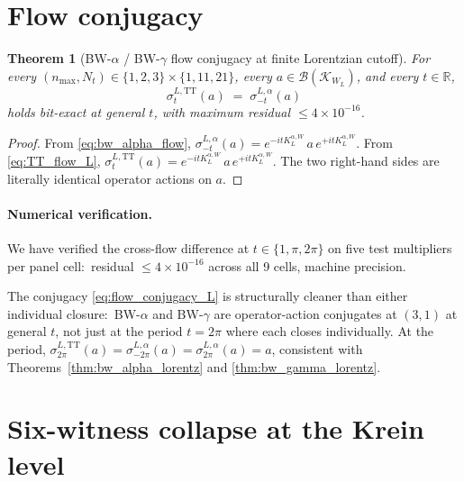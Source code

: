 \documentclass[11pt,a4paper]{article}
\theoremstyle{plain}
\newtheorem{theorem}{Theorem}[section]
\theoremstyle{definition}
\newcommand{\nmax}{n_{\max}}
\newcommand{\Nt}{N_t}
\newcommand{\Krein}{\mathcal{K}}
\newcommand{\Bcal}{\mathcal{B}}
\newcommand{\R}{\mathbb{R}}
\newcommand{\KL}{K_{L}}
\newcommand{\TT}{\mathrm{TT}}
\begin{document}
\section{Flow conjugacy}\label{sec:flow_conjugacy}

\begin{theorem}[BW-$\alpha$ / BW-$\gamma$ flow conjugacy at finite
Lorentzian cutoff]\label{thm:flow_conjugacy_L}
For every $(\nmax, \Nt) \in \{1, 2, 3\} \times \{1, 11, 21\}$, every
$a \in \Bcal(\Krein_{W_L})$, and every $t \in \R$,
\begin{equation}\label{eq:flow_conjugacy_L}
   \sigma_t^{L, \TT}(a) \;=\; \sigma_{-t}^{L, \alpha}(a)
\end{equation}
holds bit-exact at general $t$, with maximum residual
$\le 4 \times 10^{-16}$.
\end{theorem}

\begin{proof}
From \eqref{eq:bw_alpha_flow},
$\sigma_{-t}^{L, \alpha}(a) = e^{-i t \KL^{\alpha, W}}\, a\,
e^{+i t \KL^{\alpha, W}}$. From \eqref{eq:TT_flow_L},
$\sigma_t^{L, \TT}(a) = e^{-i t \KL^{\alpha, W}}\, a\,
e^{+i t \KL^{\alpha, W}}$. The two right-hand sides are literally
identical operator actions on $a$.
\end{proof}

\paragraph{Numerical verification.}
We have verified the cross-flow difference at $t \in \{1, \pi, 2\pi\}$
on five test multipliers per panel cell:\ residual
$\le 4 \times 10^{-16}$ across all 9 cells, machine precision.

The conjugacy \eqref{eq:flow_conjugacy_L} is structurally cleaner than
either individual closure:\ BW-$\alpha$ and BW-$\gamma$ are
operator-action conjugates at $(3, 1)$ at general $t$, not just at the
period $t = 2\pi$ where each closes individually. At the period,
$\sigma_{2\pi}^{L, \TT}(a) = \sigma_{-2\pi}^{L, \alpha}(a) =
\sigma_{2\pi}^{L, \alpha}(a) = a$, consistent with
Theorems~\ref{thm:bw_alpha_lorentz} and \ref{thm:bw_gamma_lorentz}.

\section{Six-witness collapse at the Krein level}\label{sec:six_witness}
\end{document}
